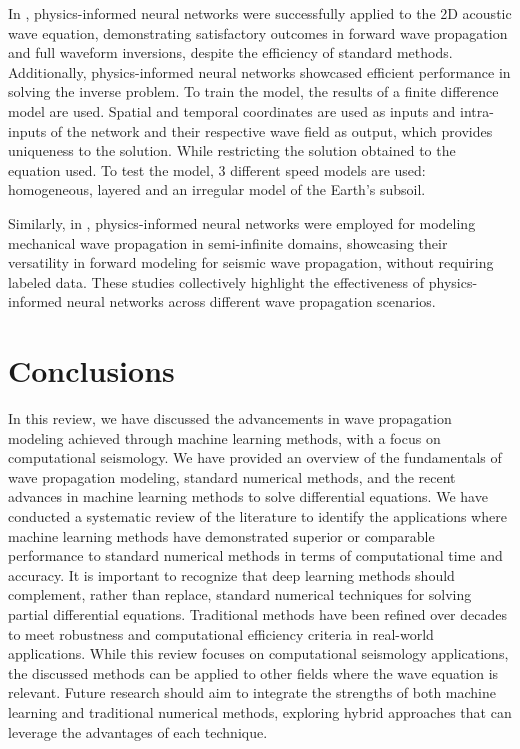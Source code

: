 \documentclass[11pt,twoside]{article}
\begin{document}
In , physics-informed neural networks were successfully 
applied to the 2D acoustic wave equation, demonstrating satisfactory outcomes in forward wave propagation and 
full waveform inversions, despite the efficiency of standard methods. Additionally, physics-informed neural networks 
showcased efficient performance in solving the inverse problem. To train the model, the results of a finite difference 
model are used. Spatial and temporal coordinates are used as inputs and intra-inputs of the network and their respective 
wave field as output, which provides uniqueness to the solution. While restricting the solution obtained to the equation 
used. To test the model, 3 different speed models are used: homogeneous, layered and an irregular model of the Earth's subsoil.

Similarly, in , physics-informed neural networks were employed for modeling 
mechanical wave propagation in semi-infinite domains, showcasing their versatility in forward modeling for seismic 
wave propagation, without requiring labeled data. These studies collectively highlight the effectiveness of physics-informed 
neural networks across different wave propagation scenarios.

\section{Conclusions}\label{sec:conclusions}

In this review, we have discussed the advancements in wave propagation modeling achieved through machine learning
methods, with a focus on computational seismology. We have provided an overview of the fundamentals of wave
propagation modeling, standard numerical methods, and the recent advances in machine learning methods to solve
differential equations. We have conducted a systematic review of the literature to identify the applications where
machine learning methods have demonstrated superior or comparable performance to standard numerical methods in terms
of computational time and accuracy. It is important to recognize that deep learning methods should complement, 
rather than replace, standard numerical techniques for solving partial differential equations. Traditional methods 
have been refined over decades to meet robustness and computational efficiency criteria in real-world applications. 
While this review focuses on computational seismology applications, the discussed methods can be applied to other 
fields where the wave equation is relevant. Future research should aim to integrate the strengths of both machine 
learning and traditional numerical methods, exploring hybrid approaches that can leverage the advantages of each 
technique.
\end{document}
